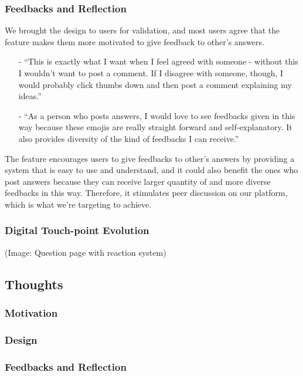 \documentclass[a4paper]{article}
\begin{document}
    \subsubsection*{Feedbacks and Reflection}
    \noindent We brought the design to users for validation, and most users agree that the feature makes them more motivated to give feedback to other's answers.
    \begin{itemize}
        \item[-] ``This is exactly what I want when I feel agreed with someone - without this I wouldn't want to post a comment.
        If I disagree with someone, though, I would probably click thumbs down and then post a comment explaining my ideas.''
        \item[-] ``As a person who posts answers, I would love to see feedbacks given in this way because these emojis are really straight forward and self-explanatory.
        It also provides diversity of the kind of feedbacks I can receive.''
    \end{itemize}

    The feature encourages users to give feedbacks to other's answers by providing a system that is easy to use and understand,
    and it could also benefit the ones who post answers because they can receive larger quantity of and more diverse feedbacks in this way.
    Therefore, it stimulates peer discussion on our platform, which is what we're targeting to achieve.

    \subsubsection*{Digital Touch-point Evolution}
    (Image: Question page with reaction system)

    \subsection*{Thoughts}

    \iffalse
    \subsubsection*{Motivation}
    \subsubsection*{Design}
    \subsubsection*{Feedbacks and Reflection}
\end{document}
